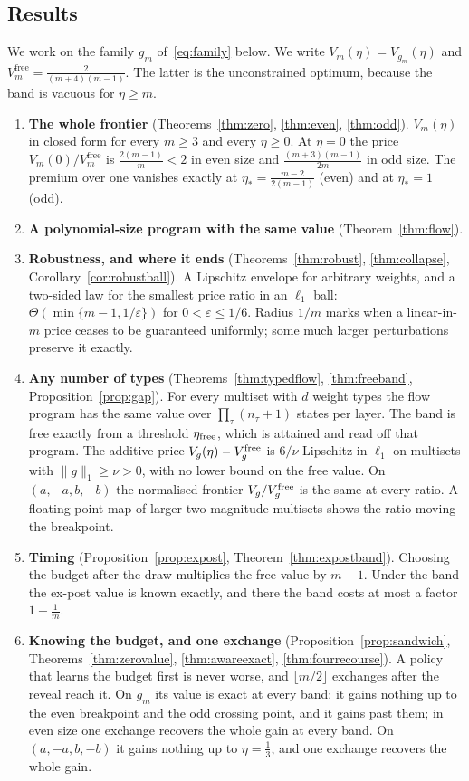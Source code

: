 \subsection{Results}

We work on the family $g_{m}$ of~\eqref{eq:family} below. We write
$V_{m}(\eta)=V_{g_{m}}(\eta)$ and $V^{\mathrm{free}}_{m}=\frac{2}{(m+4)(m-1)}$. The latter is
the unconstrained optimum, because the band is vacuous for $\eta\ge m$.

\begin{enumerate}
\item[1)] \textbf{The whole frontier} (Theorems~\ref{thm:zero}, \ref{thm:even},
\ref{thm:odd}). $V_{m}(\eta)$ in closed form for every $m\ge3$ and every $\eta\ge0$. At
$\eta=0$ the price $V_{m}(0)/V^{\mathrm{free}}_{m}$ is $\frac{2(m-1)}{m}<2$ in even size and
$\frac{(m+3)(m-1)}{2m}$ in odd size. The premium over one vanishes exactly at $\eta_{*}=\frac{m-2}{2(m-1)}$
(even) and at $\eta_{*}=1$ (odd).
\item[2)] \textbf{A polynomial-size program with the same value} (Theorem~\ref{thm:flow}).
\item[3)] \textbf{Robustness, and where it ends} (Theorems~\ref{thm:robust},
\ref{thm:collapse}, Corollary~\ref{cor:robustball}). A Lipschitz envelope for arbitrary
weights, and a two-sided law for the smallest price ratio in an $\ell_1$ ball:
$\Theta(\min\{m-1,1/\varepsilon\})$ for $0<\varepsilon\le1/6$.
Radius $1/m$ marks when a linear-in-$m$ price ceases to be guaranteed uniformly;
some much larger perturbations preserve it exactly.
\item[4)] \textbf{Any number of types} (Theorems~\ref{thm:typedflow}, \ref{thm:freeband},
Proposition~\ref{prop:gap}). For every multiset with $d$ weight types the flow program has the
same value over $\prod_\tau(n_\tau+1)$ states per layer. The band is free exactly from a threshold
$\eta_{\rm free}$, which is attained and read off that program. The additive price
$V_g(\eta)-V^{\rm free}_g$ is $6/\nu$-Lipschitz in $\ell_1$ on multisets with $\|g\|_1\ge\nu>0$, with
no lower bound on the free value.
On $(a,-a,b,-b)$ the normalised frontier $V_g/V_g^{\rm free}$ is the same at every ratio. A floating-point map of larger
two-magnitude multisets shows the ratio moving the breakpoint.
\item[5)] \textbf{Timing} (Proposition~\ref{prop:expost}, Theorem~\ref{thm:expostband}).
Choosing the budget after the draw multiplies the free value by $m-1$. Under the band the
ex-post value is known exactly, and there the band costs at most a factor $1+\frac1m$.
\item[6)] \textbf{Knowing the budget, and one exchange} (Proposition~\ref{prop:sandwich},
Theorems~\ref{thm:zerovalue}, \ref{thm:awareexact}, \ref{thm:fourrecourse}). A policy that learns
the budget first is never worse, and $\lfloor m/2\rfloor$ exchanges after the reveal reach it. On
$g_m$ its value is exact at every band: it gains nothing up to the even breakpoint and the odd
crossing point, and it gains past them; in even size one exchange recovers the whole gain at
every band. On $(a,-a,b,-b)$ it gains nothing up to $\eta=\frac13$, and one exchange recovers the
whole gain.
\end{enumerate}

